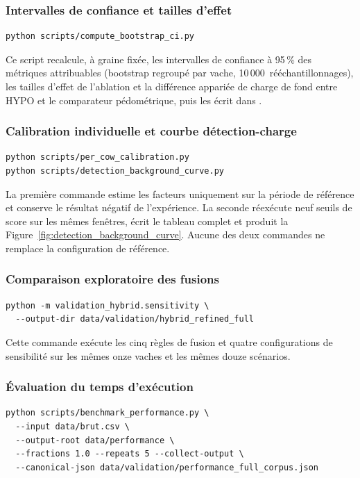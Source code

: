 \subsubsection{Intervalles de confiance et tailles d'effet}
\begin{verbatim}
python scripts/compute_bootstrap_ci.py
\end{verbatim}

Ce script recalcule, à graine fixée, les intervalles de confiance à 95\,\% des métriques
attribuables (bootstrap regroupé par vache, 10\,000~rééchantillonnages), les tailles d'effet
de l'ablation et la différence appariée de charge de fond entre HYPO et le comparateur
pédométrique, puis les écrit dans .

\subsubsection{Calibration individuelle et courbe détection-charge}
\begin{verbatim}
python scripts/per_cow_calibration.py
python scripts/detection_background_curve.py
\end{verbatim}

La première commande estime les facteurs uniquement sur la période de référence et conserve le résultat
négatif de l'expérience. La seconde réexécute neuf seuils de score sur les mêmes fenêtres,
écrit le tableau complet et produit la Figure~\ref{fig:detection_background_curve}. Aucune
des deux commandes ne remplace la configuration de référence.

\subsubsection{Comparaison exploratoire des fusions}
\begin{verbatim}
python -m validation_hybrid.sensitivity \
  --output-dir data/validation/hybrid_refined_full
\end{verbatim}

Cette commande exécute les cinq règles de fusion et quatre configurations de sensibilité sur
les mêmes onze vaches et les mêmes douze scénarios.

\subsubsection{Évaluation du temps d'exécution}
\begin{verbatim}
python scripts/benchmark_performance.py \
  --input data/brut.csv \
  --output-root data/performance \
  --fractions 1.0 --repeats 5 --collect-output \
  --canonical-json data/validation/performance_full_corpus.json
\end{verbatim}

